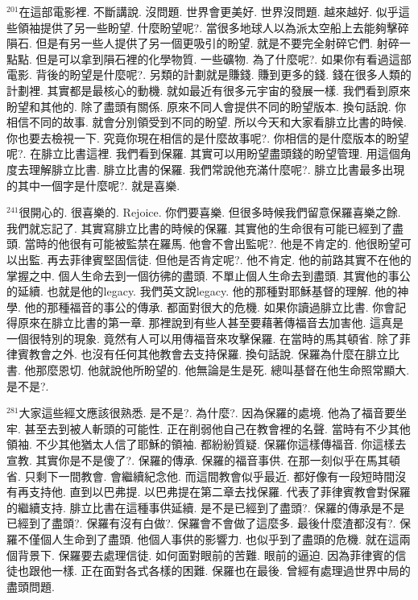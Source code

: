 \documentclass{book}
\begin{document}
$^{201}$在這部電影裡.
不斷講說.
沒問題.
世界會更美好.
世界沒問題.
越來越好.
似乎這些領袖提供了另一些盼望.
什麼盼望呢?.
當很多地球人以為派太空船上去能夠擊碎隕石.
但是有另一些人提供了另一個更吸引的盼望.
就是不要完全射碎它們.
射碎一點點.
但是可以拿到隕石裡的化學物質.
一些礦物.
為了什麼呢?.
如果你有看過這部電影.
背後的盼望是什麼呢?.
另類的計劃就是賺錢.
賺到更多的錢.
錢在很多人類的計劃裡.
其實都是最核心的動機.
就如最近有很多元宇宙的發展一樣.
我們看到原來盼望和其他的.
除了盡頭有關係.
原來不同人會提供不同的盼望版本.
換句話說.
你相信不同的故事.
就會分別領受到不同的盼望.
所以今天和大家看腓立比書的時候.
你也要去檢視一下.
究竟你現在相信的是什麼故事呢?.
你相信的是什麼版本的盼望呢?.
在腓立比書這裡.
我們看到保羅.
其實可以用盼望盡頭錢的盼望管理.
用這個角度去理解腓立比書.
腓立比書的保羅.
我們常說他充滿什麼呢?.
腓立比書最多出現的其中一個字是什麼呢?.
就是喜樂.

$^{241}$很開心的.
很喜樂的.
Rejoice.
你們要喜樂.
但很多時候我們留意保羅喜樂之餘.
我們就忘記了.
其實寫腓立比書的時候的保羅.
其實他的生命很有可能已經到了盡頭.
當時的他很有可能被監禁在羅馬.
他會不會出監呢?.
他是不肯定的.
他很盼望可以出監.
再去菲律賓堅固信徒.
但他是否肯定呢?.
他不肯定.
他的前路其實不在他的掌握之中.
個人生命去到一個彷彿的盡頭.
不單止個人生命去到盡頭.
其實他的事公的延續.
也就是他的legacy.
我們英文說legacy.
他的那種對耶穌基督的理解.
他的神學.
他的那種福音的事公的傳承.
都面對很大的危機.
如果你讀過腓立比書.
你會記得原來在腓立比書的第一章.
那裡說到有些人甚至要藉著傳福音去加害他.
這真是一個很特別的現象.
竟然有人可以用傳福音來攻擊保羅.
在當時的馬其頓省.
除了菲律賓教會之外.
也沒有任何其他教會去支持保羅.
換句話說.
保羅為什麼在腓立比書.
他那麼恩切.
他就說他所盼望的.
他無論是生是死.
總叫基督在他生命照常顯大.
是不是?.

$^{281}$大家這些經文應該很熟悉.
是不是?.
為什麼?.
因為保羅的處境.
他為了福音要坐牢.
甚至去到被人斬頭的可能性.
正在削弱他自己在教會裡的名聲.
當時有不少其他領袖.
不少其他猶太人信了耶穌的領袖.
都紛紛質疑.
保羅你這樣傳福音.
你這樣去宣教.
其實你是不是傻了?.
保羅的傳承.
保羅的福音事供.
在那一刻似乎在馬其頓省.
只剩下一間教會.
會繼續紀念他.
而這間教會似乎最近.
都好像有一段短時間沒有再支持他.
直到以巴弗提.
以巴弗提在第二章去找保羅.
代表了菲律賓教會對保羅的繼續支持.
腓立比書在這種事供延續.
是不是已經到了盡頭?.
保羅的傳承是不是已經到了盡頭?.
保羅有沒有白做?.
保羅會不會做了這麼多.
最後什麼渣都沒有?.
保羅不僅個人生命到了盡頭.
他個人事供的影響力.
也似乎到了盡頭的危機.
就在這兩個背景下.
保羅要去處理信徒.
如何面對眼前的苦難.
眼前的逼迫.
因為菲律賓的信徒也跟他一樣.
正在面對各式各樣的困難.
保羅也在最後.
曾經有處理過世界中局的盡頭問題.
\end{document}
